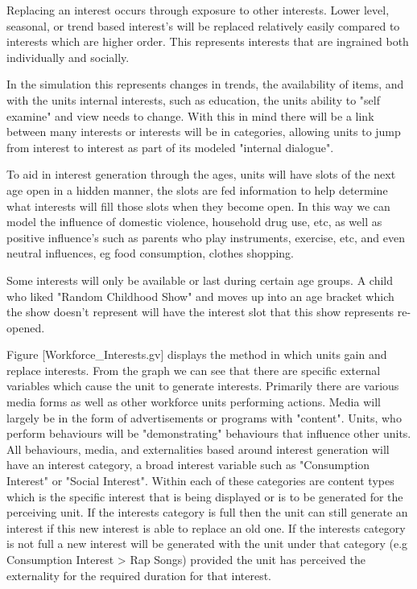 Replacing an interest occurs through exposure to other interests. Lower level, seasonal, or trend based interest's will be replaced relatively easily compared to interests which are higher order. This represents interests that are ingrained both individually and socially. 

In the simulation this represents changes in trends, the availability of items, and with the units internal interests, such as education, the units ability to "self examine" and view needs to change. With this in mind there will be a link between many interests or interests will be in categories, allowing units to jump from interest to interest as part of its modeled "internal dialogue".

To aid in interest generation through the ages, units will have slots of the next age open in a hidden manner, the slots are fed information to help determine what interests will fill those slots when they become open. In this way we can model the influence of domestic violence, household drug use, etc, as well as positive influence's such as parents who play instruments, exercise, etc, and even neutral influences, eg food consumption, clothes shopping.

Some interests will only be available or last during certain age groups. A child who liked "Random Childhood Show" and moves up into an age bracket which the show doesn't represent will have the interest slot that this show represents re-opened. 

Figure [Workforce_Interests.gv] displays the method in which units gain and replace interests. From the graph we can see that there are specific external variables which cause the unit to generate interests. Primarily there are various media forms as well as other workforce units performing actions. Media will largely be in the form of advertisements or programs with "content". Units, who perform behaviours will be "demonstrating" behaviours that influence other units. All behaviours, media, and externalities based around interest generation will have an interest category, a broad interest variable such as "Consumption Interest" or "Social Interest". Within each of these categories are content types which is the specific interest that is being displayed or is to be generated for the perceiving unit. If the interests category is full then the unit can still generate an interest if this new interest is able to replace an old one. If the interests category is not full a new interest will be generated with the unit under that category (e.g Consumption Interest > Rap Songs) provided the unit has perceived the externality for the required duration for that interest.

